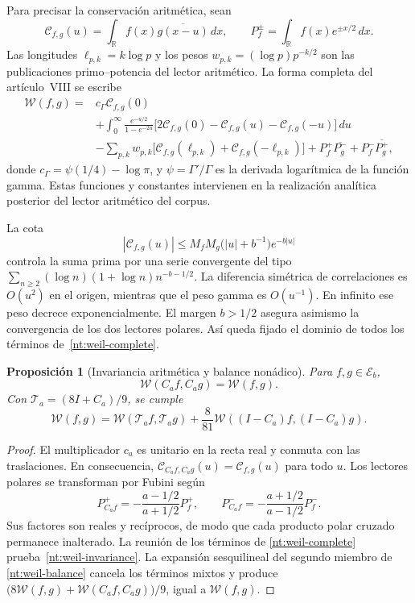 \documentclass[a4paper,10pt]{article}
\newtheorem{proposition}[theorem]{Proposición}
\theoremstyle{definition}\newtheorem{definition}[theorem]{Definición}
\theoremstyle{remark}\newtheorem{remark}[theorem]{Observación}
\numberwithin{equation}{section}
\begin{document}
Para precisar la conservación aritmética, sean
\[
 \mathcal C_{f,g}(u)
 =\int_{\mathbb R}f(x)\overline{g(x-u)}\,dx,
 \qquad
 P_f^\pm=\int_{\mathbb R}f(x)e^{\pm x/2}\,dx.
\]
Las longitudes \(\ell_{p,k}=k\log p\) y los pesos
\(w_{p,k}=(\log p)p^{-k/2}\) son las publicaciones
primo--potencia del lector aritmético. La forma completa
del artículo~VIII se escribe
\begin{equation}
 \begin{split}
 \mathscr W(f,g)={}&c_\Gamma\mathcal C_{f,g}(0)\\
 &+\int_0^\infty\frac{e^{-u/2}}{1-e^{-2u}}
 \bigl[2\mathcal C_{f,g}(0)
       -\mathcal C_{f,g}(u)-\mathcal C_{f,g}(-u)\bigr]\,du\\
 &-\sum_{p,k}w_{p,k}
   \bigl[\mathcal C_{f,g}(\ell_{p,k})
        +\mathcal C_{f,g}(-\ell_{p,k})\bigr]
 +P_f^+\overline{P_g^-}+P_f^-\overline{P_g^+},
 \end{split}
 \label{nt:weil-complete}
\end{equation}
donde \(c_\Gamma=\psi(1/4)-\log\pi\), y
\(\psi=\Gamma'/\Gamma\) es la derivada logarítmica de la
función gamma. Estas funciones y constantes intervienen
en la realización analítica posterior del lector
aritmético del corpus.

La cota
\[
 |\mathcal C_{f,g}(u)|
 \leq M_fM_g\bigl(|u|+b^{-1}\bigr)e^{-b|u|}
\]
controla la suma prima por una serie convergente del tipo
\(\sum_{n\geq2}(\log n)(1+\log n)n^{-b-1/2}\).
La diferencia simétrica de correlaciones es \(O(u^2)\)
en el origen, mientras que el peso gamma es \(O(u^{-1})\).
En infinito ese peso decrece exponencialmente.
El margen \(b>1/2\) asegura asimismo la convergencia de
los dos lectores polares. Así queda fijado el dominio
de todos los términos de~\eqref{nt:weil-complete}.

\begin{proposition}[Invariancia aritmética y balance nonádico]
Para \(f,g\in\mathscr E_b\),
\begin{equation}
 \mathscr W(C_af,C_ag)=\mathscr W(f,g).
 \label{nt:weil-invariance}
\end{equation}
Con \(\mathcal T_a=(8I+C_a)/9\), se cumple
\begin{equation}
 \mathscr W(f,g)
 =\mathscr W(\mathcal T_af,\mathcal T_ag)
 +\frac8{81}\mathscr W((I-C_a)f,(I-C_a)g).
 \label{nt:weil-balance}
\end{equation}
\end{proposition}

\begin{proof}
El multiplicador \(c_a\) es unitario en la recta real y
conmuta con las traslaciones. En consecuencia,
\(\mathcal C_{C_af,C_ag}(u)=\mathcal C_{f,g}(u)\)
para todo \(u\). Los lectores polares se transforman
por Fubini según
\[
 P_{C_af}^+
 =-\frac{a-1/2}{a+1/2}P_f^+,\qquad
 P_{C_af}^-
 =-\frac{a+1/2}{a-1/2}P_f^-.
\]
Sus factores son reales y recíprocos, de modo que
cada producto polar cruzado permanece inalterado.
La reunión de los términos de
\eqref{nt:weil-complete} prueba~\eqref{nt:weil-invariance}.
La expansión sesquilineal del segundo miembro de
\eqref{nt:weil-balance} cancela los términos mixtos y
produce
\(\bigl(8\mathscr W(f,g)+
\mathscr W(C_af,C_ag)\bigr)/9\), igual a
\(\mathscr W(f,g)\).
\end{proof}
\end{document}
